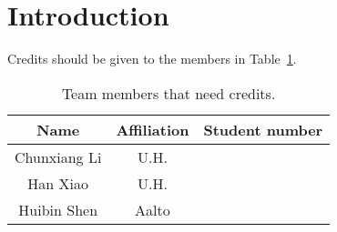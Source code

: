 
\section{Introduction}

Credits should be given to the members in Table~\ref{member_credit}.

\begin{table}[ht]
	\begin{center}
		\begin{tabular}{|c|c|c|} \hline
			\textbf{Name} & \textbf{Affiliation} & \textbf{Student number} \\ \hline
			Chunxiang Li & U.H. & \\ \hline
			Han Xiao & U.H. & \\ \hline
			Huibin Shen & Aalto & \\ \hline
		\end{tabular}
	\end{center}
	\caption{Team members that need credits.}
	\label{member_credit}
\end{table}